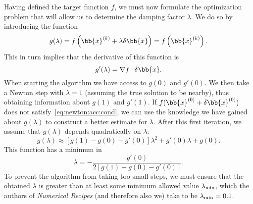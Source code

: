 \documentclass{notes}
\begin{document}
    Having defined the target function $f$, we must now formulate the
    optimization problem that will allow us to determine the damping factor
    $\lambda$. We do so by introducing the function
    \begin{equation}
        g(\lambda) = f\left(\bb{x}^{(k)} + \lambda\delta\bb{x}\right) = f\left(\bb{x}^{(k)}\right).
    \end{equation}
    This in turn implies that the derivative of this function is
    \begin{equation}
        g'(\lambda) = \nabla f\cdot\delta\bb{x}.
    \end{equation}
    When starting the algorithm we have access to $g(0)$ and $g'(0)$. We then
    take a Newton step with $\lambda=1$ (assuming the true solution to be
    nearby), thus obtaining information about $g(1)$ and $g'(1)$. If
    $f(\bb{x}^{(0)}+\delta\bb{x}^{(0)})$ does not
    satisfy~\eqref{eq:newton:acc:cond}, we can use the knowledge we have gained
    about $g(\lambda)$ to construct a better estimate for $\lambda$. After this
    first iteration, we assume that $g(\lambda)$ depends quadratically on
    $\lambda$:
    \begin{equation}
        g(\lambda)\approx \left[ g(1)-g(0)-g'(0) \right]\lambda^2 +
        g'(0)\lambda + g(0).
    \end{equation}
    This function has a minimum in
    \begin{equation}
        \lambda = -\frac{g'(0)}{2\left[ g(1)-g(0)-g'(0) \right]}.
    \end{equation}
    To prevent the algorithm from taking too small steps, we must ensure that
    the obtained $\lambda$ is greater than at least some minimum allowed value
    $\lambda_{\rm min}$, which the authors of {\em Numerical Recipes} (and
    therefore also we) take to be $\lambda_{\rm min} = 0.1$.
\end{document}
